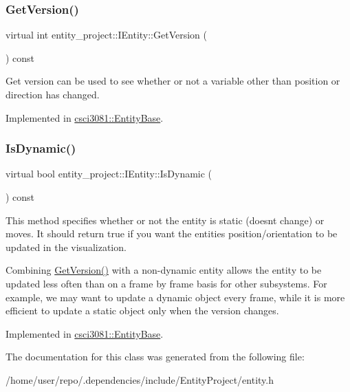 \mbox{\label{classentity__project_1_1IEntity_a254b8c22f103ebf23261cb79bc121118}} 
\subsubsection{\texorpdfstring{Get\+Version()}{GetVersion()}}
{\footnotesize\ttfamily virtual int entity\+\_\+project\+::\+I\+Entity\+::\+Get\+Version (\begin{DoxyParamCaption}{ }\end{DoxyParamCaption}) const\hspace{0.3cm}{\ttfamily [pure virtual]}}

Get version can be used to see whether or not a variable other than position or direction has changed. 

Implemented in \hyperlink{classcsci3081_1_1EntityBase_af5c87e8daf9161dc8c959c355b076bea}{csci3081\+::\+Entity\+Base}.

\mbox{\label{classentity__project_1_1IEntity_a58d710abd04e533123d033a7ba80f017}} 
\subsubsection{\texorpdfstring{Is\+Dynamic()}{IsDynamic()}}
{\footnotesize\ttfamily virtual bool entity\+\_\+project\+::\+I\+Entity\+::\+Is\+Dynamic (\begin{DoxyParamCaption}{ }\end{DoxyParamCaption}) const\hspace{0.3cm}{\ttfamily [pure virtual]}}

This method specifies whether or not the entity is static (doesn\textquotesingle{}t change) or moves. It should return true if you want the entities position/orientation to be updated in the visualization.

Combining \hyperlink{classentity__project_1_1IEntity_a254b8c22f103ebf23261cb79bc121118}{Get\+Version()} with a non-\/dynamic entity allows the entity to be updated less often than on a frame by frame basis for other subsystems. For example, we may want to update a dynamic object every frame, while it is more efficient to update a static object only when the version changes. 

Implemented in \hyperlink{classcsci3081_1_1EntityBase_aa2a894f7821745acd91fbfb2e2e92082}{csci3081\+::\+Entity\+Base}.



The documentation for this class was generated from the following file\+:\begin{DoxyCompactItemize}
\item 
/home/user/repo/.\+dependencies/include/\+Entity\+Project/entity.\+h\end{DoxyCompactItemize}

